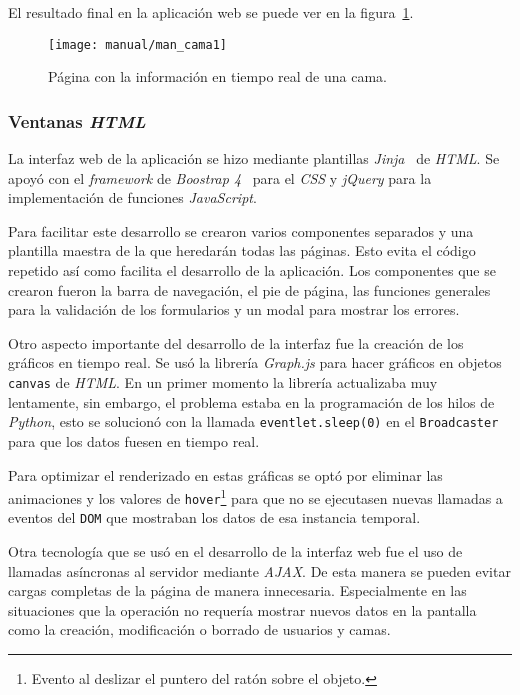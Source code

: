 El resultado final en la aplicación web se puede ver en la figura~\ref{fig:man_bed}.

\begin{figure}
	\centering
	\texttt{[image: manual/man\_cama1]}
	\caption{Página con la información en tiempo real de una cama.}
	\label{fig:man_bed}
\end{figure}


\subsubsection{Ventanas \textit{HTML}}

La interfaz web de la aplicación se hizo mediante plantillas \textit{Jinja}~\cite{tool:jinja} de \textit{HTML}. Se apoyó con el \textit{framework} de \textit{Boostrap 4}~\cite{wiki:boostrap} para el \textit{CSS} y \textit{jQuery} para la implementación de funciones \textit{JavaScript}.

Para facilitar este desarrollo se crearon varios componentes separados y una plantilla maestra de la que heredarán todas las páginas. Esto evita el código repetido así como facilita el desarrollo de la aplicación. Los componentes que se crearon fueron la barra de navegación, el pie de página, las funciones generales para la validación de los formularios y un modal para mostrar los errores.

Otro aspecto importante del desarrollo de la interfaz fue la creación de los gráficos en tiempo real. Se usó la librería \textit{Graph.js} para hacer gráficos en objetos \texttt{canvas} de \textit{HTML}. En un primer momento la librería actualizaba muy lentamente, sin embargo, el problema estaba en la programación de los hilos de \textit{Python}, esto se solucionó con la llamada \texttt{eventlet.sleep(0)} en el \texttt{Broadcaster} para que los datos fuesen en tiempo real.

Para optimizar el renderizado en estas gráficas se optó por eliminar las animaciones y los valores de \texttt{hover}\footnote{Evento al deslizar el puntero del ratón sobre el objeto.} para que no se ejecutasen nuevas llamadas a eventos del \texttt{DOM} que mostraban los datos de esa instancia temporal.

Otra tecnología que se usó en el desarrollo de la interfaz web fue el uso de llamadas asíncronas al servidor mediante \textit{AJAX}. De esta manera se pueden evitar cargas completas de la página de manera innecesaria. Especialmente en las situaciones que la operación no requería mostrar nuevos datos en la pantalla como la creación, modificación o borrado de usuarios y camas. 

